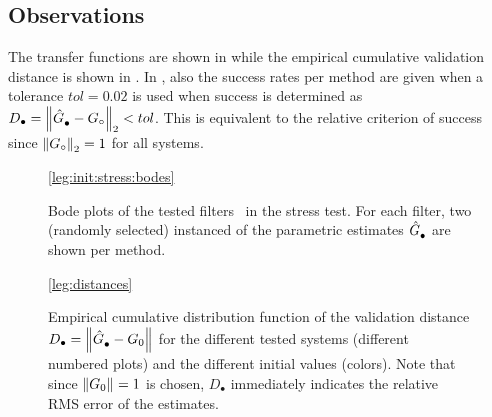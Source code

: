 \subsection{Observations}
The transfer functions are shown in  while the empirical cumulative validation distance is shown in .
In , also the success rates per method are given when a tolerance $tol = 0.02$ is used when success is determined as $D_{\bullet} = \norm[2]{\model{\bullet} - \true{G}} < tol$.
This is equivalent to the relative criterion of success since $\norm[2]{\true{G}} = 1$ for all systems.

\begin{figure}[p]
  \setlength{\figurewidth}{0.85\columnwidth}
  \setlength{\figureheight}{0.68\figurewidth}
  \centering
  \ref{leg:init:stress:bodes}
  
  \caption[Bode plots of the stress test filters.]{Bode plots of the tested filters~ in the stress test. 
  For each filter, two (randomly selected) instanced of the parametric estimates $\model{\bullet}$ are shown per method.
  }
  \label{fig:bodeplots}
\end{figure}

\begin{figure}[p]
  \setlength{\figurewidth}{0.85\columnwidth}
  \setlength{\figureheight}{0.68\figurewidth}
  \centering
  \ref{leg:distances}
  
  \caption[Empirical  of $\validationDistance{\bullet}$ in the stress test.]{Empirical cumulative distribution function of the validation distance $D_{\bullet} = \norm{\model{\bullet} - G_0}$ for the different tested systems (different numbered plots) and the different initial values (colors).
  Note that since $\norm{G_0}=1$ is chosen, $D_{\bullet}$ immediately indicates the relative RMS error of the estimates.
  }
  \label{fig:distancesStress}
\end{figure}

